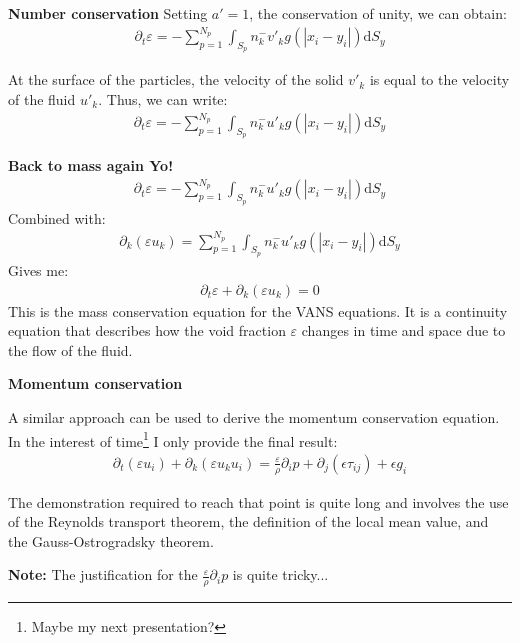\documentclass[c,11pt,xcolor=dvipsnames, aspectratio=169]{beamer}
\newcommand{\pp}[1]{\left(#1\right)}
\begin{document}
\begin{frame}{\textbf{Number conservation}}
Setting $a'=1$, the conservation of unity, we can obtain:
\begin{align*}
\partial_t \varepsilon = - \sum_{p=1}^{N_p} \int_{S_{p}} n_k^{-} v'_k g(|x_i-y_i|) \mathrm{d}S_y
\end{align*}

At the surface of the particles, the velocity of the solid $v'_k$ is equal to the velocity of the fluid $u'_k$. Thus, we can write:
\begin{align*}
\partial_t \varepsilon = - \sum_{p=1}^{N_p} \int_{S_{p}} n_k^{-} u'_k g(|x_i-y_i|) \mathrm{d}S_y
\end{align*}
\end{frame}

\begin{frame}{\textbf{Back to mass again Yo!}}
\begin{align*}
\partial_t \varepsilon = - \sum_{p=1}^{N_p} \int_{S_{p}} n_k^{-} u'_k g(|x_i-y_i|) \mathrm{d}S_y
\end{align*}
Combined with:
\begin{align*}
\partial_k \pp{\varepsilon u_k} = \sum_{p=1}^{N_p} \int_{S_{p}} n_k^{-} u'_k g(|x_i-y_i|) \mathrm{d}S_y 
\end{align*}
Gives me:
\begin{align*}
\partial_t \varepsilon + \partial_k \pp{\varepsilon u_k} = 0
\end{align*}
This is the mass conservation equation for the VANS equations. It is a continuity equation that describes how the void fraction $\varepsilon$ changes in time and space due to the flow of the fluid.
\end{frame}

\begin{frame}{\textbf{Momentum conservation}}

A similar approach can be used to derive the momentum conservation equation. In the interest of time\footnote{Maybe my next presentation?} I only provide the final result:
\begin{align*}
\partial_t \pp{\varepsilon u_i} + \partial_k \pp{\varepsilon u_k u_i} = \frac{\varepsilon}{\rho} \partial_i p + \partial_j \left(\epsilon \tau_{ij}\right) + \epsilon g_i
\end{align*}

The demonstration required to reach that point is quite long and involves the use of the Reynolds transport theorem, the definition of the local mean value, and the Gauss-Ostrogradsky theorem.

{
	\textbf{Note: } The justification for the $ \frac{\varepsilon}{\rho} \partial_i p $ is quite tricky...
}
\end{frame}
\end{document}
